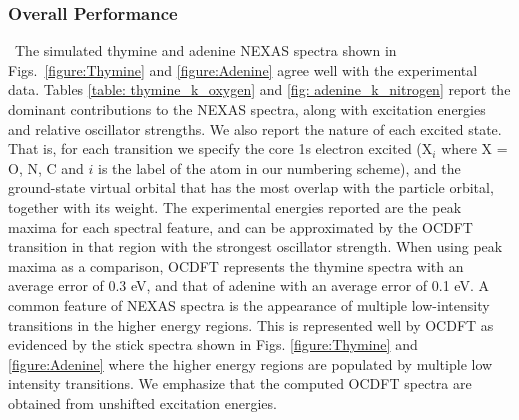 \documentclass[12pt]{article}
\begin{document}
\subsubsection{Overall Performance}
\ The simulated thymine and adenine NEXAS spectra shown in Figs.~\ref{figure:Thymine} and \ref{figure:Adenine} agree well with the experimental data. Tables \ref{table: thymine_k_oxygen} and \ref{fig: adenine_k_nitrogen} report the dominant contributions to the NEXAS spectra, along with excitation energies and relative oscillator strengths. We also report the nature of each excited state. That is, for each transition we specify the core 1s electron excited (X$_i$ where X = O, N, C and $i$ is the label of the atom in our numbering scheme), and the ground-state virtual orbital that has the most overlap with the particle orbital, together with its weight.
 The experimental energies reported are the peak maxima for each spectral feature, and can be approximated by the OCDFT transition in that region with the strongest oscillator strength. When using peak maxima as a comparison, OCDFT represents the thymine spectra with an average error of 0.3 eV, and that of adenine with an average error of 0.1 eV. A common feature of NEXAS spectra is the appearance of multiple low-intensity transitions in the higher energy regions. This is represented well by OCDFT as evidenced by the stick spectra shown in Figs. \ref{figure:Thymine} and \ref{figure:Adenine} where the higher energy regions are populated by multiple low intensity transitions. We emphasize that the computed OCDFT spectra are obtained from unshifted excitation energies. 
\end{document}
